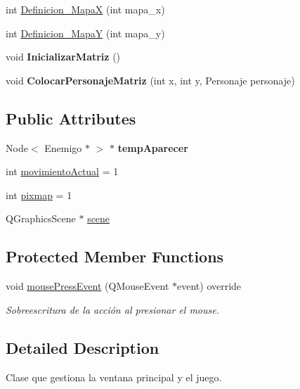 \begin{DoxyCompactItemize}
int \hyperlink{classMainWindow_aa06021cdca887a633eace0bf8761b3e7}{Definicion\+\_\+\+MapaX} (int mapa\+\_\+x)
\item 
int \hyperlink{classMainWindow_a4b1f37b214d278525abbae10445e64a9}{Definicion\+\_\+\+MapaY} (int mapa\+\_\+y)
\item 
\mbox{\label{classMainWindow_a0c003f190f9ed9d61e15d5296e08c524}} 
void {\bfseries Inicializar\+Matriz} ()
\item 
\mbox{\label{classMainWindow_ab713c2c0338c0cc138981042b2cba1bc}} 
void {\bfseries Colocar\+Personaje\+Matriz} (int x, int y, Personaje personaje)
\end{DoxyCompactItemize}
\subsection*{Public Attributes}
\begin{DoxyCompactItemize}
\item 
\mbox{\label{classMainWindow_a271cda81826d58a272a7b42447d8d90f}} 
Node$<$ Enemigo $\ast$ $>$ $\ast$ {\bfseries temp\+Aparecer}
\item 
int \hyperlink{classMainWindow_ade7c819849bfce458b66795a473697e5}{movimiento\+Actual} = 1
\item 
int \hyperlink{classMainWindow_a1c3bc1ef6b18ff768eaebb009fa9957d}{pixmap} = 1
\item 
Q\+Graphics\+Scene $\ast$ \hyperlink{classMainWindow_a51ac2b126495216832501cea3929c6f6}{scene}
\end{DoxyCompactItemize}
\subsection*{Protected Member Functions}
\begin{DoxyCompactItemize}
\item 
void \hyperlink{classMainWindow_a1dff511c9697cbcb60150894f480b9c8}{mouse\+Press\+Event} (Q\+Mouse\+Event $\ast$event) override
\begin{DoxyCompactList}\small\item\em Sobreescritura de la acción al presionar el mouse. \end{DoxyCompactList}\end{DoxyCompactItemize}


\subsection{Detailed Description}
Clase que gestiona la ventana principal y el juego. 

